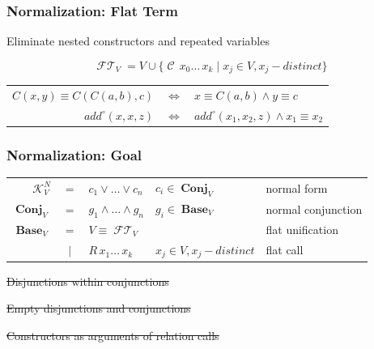 \documentclass[xcolor=table, aspectratio=169]{beamer}
\newcommand{\makenote}[1]{\hfill \footnotesize{#1}}
\newcommand{\strikeoutnote}[1]{\makenote{\strikethrough{#1}}}
\newcommand{\strikethrough}[1]{\sout{#1}}
\DeclareMathOperator{\FlatTerm}{\mathcal{FT}}
\DeclareMathOperator{\Cons}{\mathcal{C}}
\DeclareMathOperator{\Base}{\mathbf{Base}}
\DeclareMathOperator{\Conj}{\mathbf{Conj}}
\newcommand{\KanN}{\mathcal{K}^{N}}
\begin{document}
\begin{frame}[fragile]
  \frametitle{Normalization: Flat Term}
\begin{center}

Eliminate nested constructors and repeated variables

\end{center}

  \[  \FlatTerm_{V} = V \cup \{\Cons \, x_0 \ldots \, x_{k} \mid x_{j}\in V, x_j - distinct \} \]

\vfill

\begin{center}
\begin{tabular}{rcl}
 $C\left( x, y \right) \equiv C\left( C\left( a, b \right), c \right)$ & $\iff$ &  $x \equiv C\left( a, b \right) \land y \equiv c$ \\
 $add^{\circ}(x, x, z)$ & $\iff$ & $add^{\circ}\left( x_1, x_2, z \right) \land x_1 \equiv x_2$
\end{tabular}
\end{center}

\end{frame}

\begin{frame}[fragile]
  \frametitle{Normalization: Goal}
\begin{center}
\begin{tabular}{rclll}
$\KanN_{V}$ & $=$ & $c_1 \vee \ldots \vee c_{n}$ & $c_{i}\in \Conj_{V}$ & normal form \\
$\Conj_{V}$ & $=$ & $g_1 \wedge \ldots \wedge g_n$ & $ g_{i}\in \Base_{V}$ & normal conjunction \\
$\Base_{V}$ & $=$ & $V \equiv \FlatTerm_{V}$ & & flat unification \\
            & $\mid$ & $R \, x_1 \ldots \, x_{k} $ & $ x_{j}\in V, x_j - distinct$ & flat call \\
\end{tabular}
\end{center}


\vfill

\strikeoutnote{Disjunctions within conjunctions}

\strikeoutnote{Empty disjunctions and conjunctions}

\strikeoutnote{Constructors as arguments of relation calls}

\end{frame}
\end{document}
